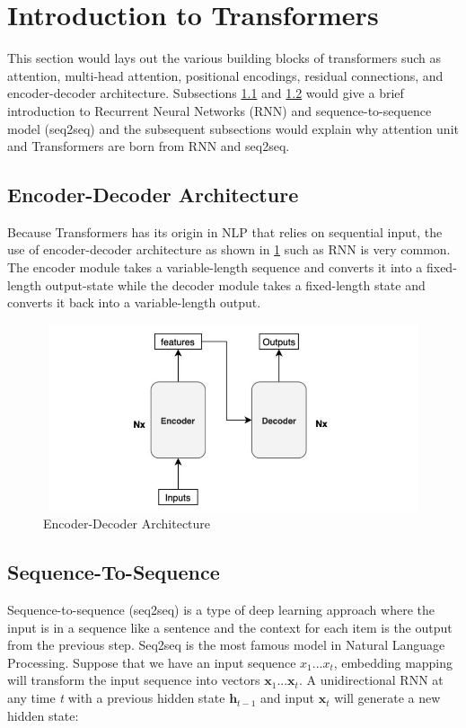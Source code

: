 \section{Introduction to Transformers}
This section would  lays out the various building blocks of transformers such as attention, multi-head attention, positional encodings, residual connections, and encoder-decoder architecture. Subsections \ref{subsection: encoder-decoder} and \ref{subsection: sequence} would give a brief introduction to Recurrent Neural Networks (RNN) and sequence-to-sequence model (seq2seq) and the subsequent subsections would explain why attention unit and Transformers are born from RNN and seq2seq. 
\subsection{Encoder-Decoder Architecture} \label{subsection: encoder-decoder}

Because Transformers has its origin in NLP that relies on sequential input, the use of encoder-decoder architecture as shown in \ref{fig:encoder-decoder} such as RNN is very common. The encoder module takes a variable-length sequence and converts it into a fixed-length output-state while the decoder module takes a fixed-length state and converts it back into a variable-length output.
\begin{figure}[ht]
\includegraphics[width=13.5cm, height=5.5cm]{images/encodeer-decoder.jpg}
\centering
\caption{Encoder-Decoder Architecture}
\label{fig:encoder-decoder}
\end{figure}



\subsection{Sequence-To-Sequence} \label{subsection: sequence}

Sequence-to-sequence (seq2seq) is a type of deep learning approach where the input is in a sequence like a sentence and the context for each item is the output from the previous step. Seq2seq is the most famous model in Natural Language Processing. Suppose that we have an input sequence $x_1...x_t$, embedding mapping will transform the input sequence into vectors $\mathbf{x}_1...\mathbf{x}_t$. A unidirectional RNN at any time \textit{t} with a previous hidden state $\mathbf{h}_{t-1}$ and input $\mathbf{x}_t$ will generate a new hidden state:

